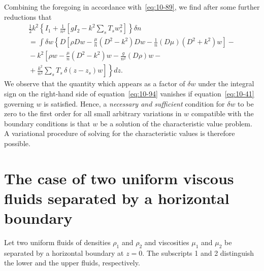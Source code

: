 Combining the foregoing in accordance with~\eqref{eq:10-89}, we find after some further reductions that
\begin{align}
\label{eq:10-94}
\tfrac{1}{2}k^2\!\left\{I_1+\frac{1}{n^2}\left[gI_2-k^2\sum_s T_sw_s^2\right]\right\}\!\delta n \nonumber\\
= \int\delta w\!\left\{D\!\left[\rho Dw - \frac{\mu}{n}(D^2-k^2)Dw - \frac{1}{n}(D\mu)(D^2+k^2)w\right] - {}\right. \nonumber\\
{} - k^2\!\left[\rho w - \frac{\mu}{n}(D^2-k^2)w - \frac{g}{n^2}(D\rho)w - {}\right. \nonumber\\
\left.\left. {} + \frac{k^2}{n^2}\sum_s T_s\,\delta(z-z_s)w\right]\right\}\!dz.
\end{align}
We observe that the quantity which appears as a factor of $\delta w$ under the integral sign on the right-hand side of equation~\eqref{eq:10-94} vanishes if equation~\eqref{eq:10-41} governing $w$ is satisfied. Hence, a \emph{necessary and sufficient} condition for $\delta w$ to be zero to the first order for all small arbitrary variations in $w$ compatible with the boundary conditions is that $w$ be a solution of the characteristic value problem. A variational procedure of solving for the characteristic values is therefore possible.

\section{The case of two uniform viscous fluids separated by a horizontal boundary}\label{sec:94}

Let two uniform fluids of densities $\rho_1$ and $\rho_2$ and viscosities $\mu_1$ and $\mu_2$ be separated by a horizontal boundary at $z = 0$. The subscripts 1 and 2 distinguish the lower and the upper fluids, respectively.

